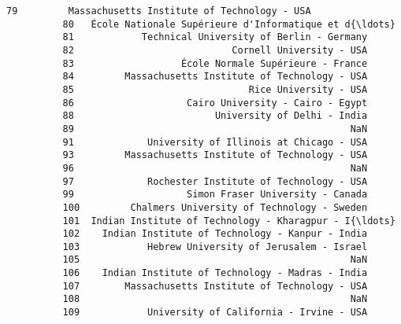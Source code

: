 \documentclass[11pt]{article}
\begin{document}
\begin{Verbatim}[commandchars=\\\{\}]
          79         Massachusetts Institute of Technology - USA   
          80   École Nationale Supérieure d'Informatique et d{\ldots}   
          81            Technical University of Berlin - Germany   
          82                            Cornell University - USA   
          83                   École Normale Supérieure - France   
          84         Massachusetts Institute of Technology - USA   
          85                               Rice University - USA   
          86                    Cairo University - Cairo - Egypt   
          88                         University of Delhi - India   
          89                                                 NaN   
          91             University of Illinois at Chicago - USA   
          93         Massachusetts Institute of Technology - USA   
          96                                                 NaN   
          97             Rochester Institute of Technology - USA   
          99                    Simon Fraser University - Canada   
          100         Chalmers University of Technology - Sweden   
          101  Indian Institute of Technology - Kharagpur - I{\ldots}   
          102    Indian Institute of Technology - Kanpur - India   
          103            Hebrew University of Jerusalem - Israel   
          105                                                NaN   
          106    Indian Institute of Technology - Madras - India   
          107        Massachusetts Institute of Technology - USA   
          108                                                NaN   
          109            University of California - Irvine - USA   
          

\end{Verbatim}
\end{document}
